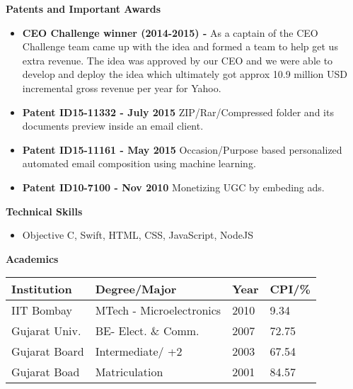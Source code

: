 \documentclass[a4paper,11pt,times]{res}
\newcommand{\smalitem}[1]{\item #1 \vspace{-4pt}}
\newcommand{\resheading}[1]{{\large \colorbox{mygrey}{\begin{minipage}{\textwidth}{\textbf{#1 \vphantom{p\^{E}}}}\end{minipage}}\vspace{4pt}}}
\begin{document}
\resheading{Patents and Important Awards}
\begin{itemize}
\smalitem{\textbf{CEO Challenge winner (2014-2015)  -} As a captain of the CEO Challenge team came up with the idea and formed a team to help get us extra revenue. The idea was approved by our CEO and we were able to develop and deploy the idea which ultimately got approx 10.9 million USD incremental gross revenue per year for Yahoo.}
\smalitem{\textbf{Patent ID15-11332 - July 2015} ZIP/Rar/Compressed folder and its documents preview inside an email client.}
\smalitem{\textbf{Patent ID15-11161 - May 2015} Occasion/Purpose based personalized automated email composition using machine learning.}
\smalitem{\textbf{Patent ID10-7100 - Nov 2010} Monetizing UGC by embeding ads.}
\end{itemize}


\resheading{Technical Skills}
\begin{itemize}
\smalitem{Objective C, Swift, HTML, CSS, JavaScript, NodeJS}
\end{itemize} 

\resheading{Academics}
\begin{tabular*}{105mm}{l l l l}
\hline
\textbf{Institution}&\textbf{Degree/Major}&\textbf{Year}&\textbf{CPI/\%}\\
\hline
IIT Bombay & MTech - Microelectronics & 2010 & 9.34\\
Gujarat Univ. & BE- Elect. \& Comm. & 2007 & 72.75\\
Gujarat Board & Intermediate/ +2 & 2003 & 67.54\\
Gujarat Boad & Matriculation & 2001 & 84.57\\
\hline
\end{tabular*}
\end{document}
